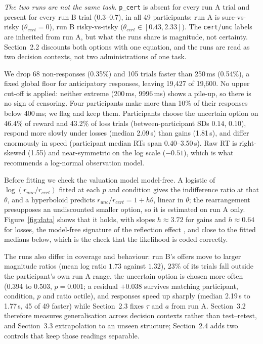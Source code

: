 \documentclass[11pt,a4paper]{article}
\begin{document}
\emph{The two runs are not the same task.} \texttt{p\_cert} is absent for every run A trial and
present for every run B trial ($0.3$--$0.7$), in all 49 participants: run A is sure-vs-risky
($\theta_{cert}=0$), run B risky-vs-risky ($\theta_{cert}\in[0.43,2.33]$). The
\texttt{cert}/\texttt{unc} labels are inherited from run A, but what the runs share is
magnitude, not certainty. Section~2.2 discounts both options with one equation, and the runs are
read as two decision contexts, not two administrations of one task.

We drop 68 non-responses (0.35\%) and 105 trials faster than 250\,ms (0.54\%), a fixed global
floor for anticipatory responses, leaving 19{,}427 of 19{,}600. No upper cut-off is applied:
neither extreme (200\,ms, 9996\,ms) shows a pile-up, so there is no sign of censoring. Four
participants make more than 10\% of their responses below 400\,ms; we flag and keep them. Participants choose the uncertain option on 46.4\% of reward and 43.2\% of
loss trials (between-participant SDs $0.14$, $0.10$), respond more slowly under losses (median
2.09\,s) than gains (1.81\,s), and differ enormously in speed (participant median RTs span
0.40--3.50\,s). Raw RT is right-skewed (1.55) and near-symmetric on the log scale ($-0.51$),
which is what recommends a log-normal observation model.

Before fitting we check the valuation model model-free. A logistic of
$\log(r_{unc}/r_{cert})$ fitted at each $p$ and condition gives the indifference ratio at that
$\theta$, and a hyperboloid predicts $r_{unc}/r_{cert}=1+h\theta$, linear in $\theta$; the
rearrangement presupposes an undiscounted smaller option, so it is estimated on run A only.
Figure~\ref{fig:data} shows that it holds, with slopes $h\approx3.72$ for gains and
$h\approx0.64$ for losses, the model-free signature of the reflection effect
\citep{kahneman1979,green2004}, and close to the fitted medians below, which is the check that
the likelihood is coded correctly.

The runs also differ in coverage and behaviour: run B's offers move to larger magnitude ratios
(mean log ratio $1.73$ against $1.32$), 23\% of its trials fall outside the participant's own
run A range, the uncertain option is chosen more often (0.394 to 0.503, $p=0.001$; a residual
$+0.038$ survives matching participant, condition, $p$ and ratio octile), and responses speed up
sharply (median 2.19\,s to 1.77\,s, 45 of 49 faster) while Section~2.3 fixes $\tau$ and $a$ from
run A. Section~3.2 therefore measures generalisation across decision contexts rather than
test--retest, and Section~3.3 extrapolation to an unseen structure; Section~2.4 adds two
controls that keep those readings separable.
\end{document}
